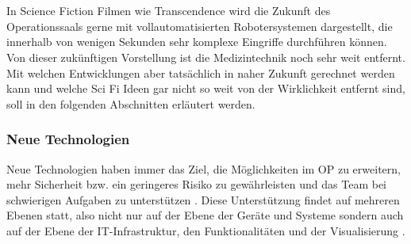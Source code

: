 \chapter{}
\label{sec:overview}

In Science Fiction Filmen wie Transcendence wird die Zukunft des Operationssaals gerne mit vollautomatisierten Robotersystemen dargestellt, die innerhalb von wenigen Sekunden sehr komplexe Eingriffe durchführen können. 
Von dieser zukünftigen Vorstellung ist die Medizintechnik noch sehr weit entfernt. Mit welchen Entwicklungen aber tatsächlich in naher Zukunft gerechnet werden kann und welche Sci Fi Ideen gar nicht so weit von der Wirklichkeit entfernt sind, soll in den folgenden Abschnitten erläutert werden.

\subsection{Neue Technologien}
Neue Technologien haben immer das Ziel, die Möglichkeiten im OP zu erweitern, mehr Sicherheit bzw. ein geringeres Risiko zu gewährleisten und das Team bei schwierigen Aufgaben zu unterstützen \cite{CurrentAndFuture}. Diese Unterstützung findet auf mehreren Ebenen statt, also nicht nur auf der Ebene der Geräte und Systeme sondern auch auf der Ebene der IT-Infrastruktur, den Funktionalitäten und der Visualisierung \cite{DerDigitaleOperationssaal}.

